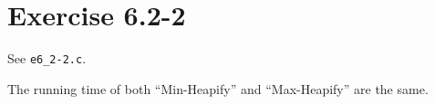 \documentclass{article}
\begin{document}
\section*{Exercise 6.2-2}

See \texttt{e6\_2-2.c}.

The running time of both ``Min-Heapify'' and ``Max-Heapify'' are the same.
\end{document}
